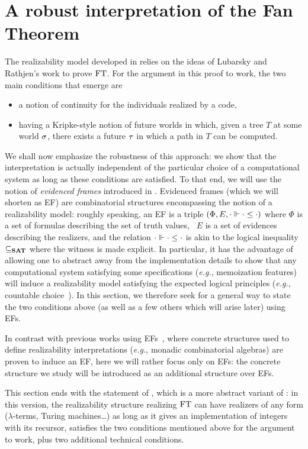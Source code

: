 \documentclass[a4paper,UKenglish,cleveref, autoref, thm-restate]{lipics-v2021}
\begin{document}
\section{A robust interpretation of the Fan Theorem}
\label{s:robust}
The realizability model developed in  relies on the ideas
of Lubarsky and Rathjen's work \cite{LubRat13} to prove $\mathrm{FT}$.
For the argument in this proof to work, the two main conditions that emerge are
\begin{itemize}
\item a notion of continuity for the individuals realized by a code,
\item having a Kripke-style notion of future worlds in which, given a tree $T$ at some world $\sigma$,
there exists a future $\tau$ in which a path in $T$ can be computed.
\end{itemize}
We shall now emphasize the robustness of this approach: we show that the interpretation
is actually independent of the particular choice of a computational system as long as these conditions are satisfied.
To that end, we will use the notion of \emph{evidenced frames} introduced in \cite{CohMiqTat21}.
Evidenced frames (which we will shorten as EF) are combinatorial structures encompassing
the notion of a realizability model:
roughly speaking, an EF is a triple $( \Phi, E, \cdot \Vdash \cdot \leq \cdot )$
where $\Phi$ is a set of formulas describing the set of truth values,
~$E$ is a set of evidences describing the realizers,
and the relation $\cdot \Vdash \cdot \leq \cdot$ is akin to the logical inequality $\subseteq_{{\mathbf{SAT}}}$
where the witness is made explicit.
In particular, it has the advantage of allowing one to abstract away
from the implementation details to show that any computational system satisfying
some specifications (\emph{e.g.}, memoization features) will induce a realizability model
satisfying the expected logical principles (\emph{e.g.}, countable choice~\cite{CohMiqTat21}).
In this section, we therefore seek for a general way to state the two conditions above
(as well as a few others which will arise later) using EFs.

In contrast with previous works using EFs~\cite{CohMiqTat21,GarMiq23,CohGruKirMiq25EffHOL,
CohGruKirMiq25mca}, where concrete structures used to define realizability interpretations
(\textit{e.g.}, monadic combinatorial algebras) are proven to induce an EF,
here we will rather focus only on EFs:
the concrete structure we study will be introduced as an additional structure
over EFs.

This section ends with the statement of , which is a more abstract
variant of : in this version, the realizability structure realizing $\mathrm{FT}$ can have realizers of any form ($\lambda$-terms, Turing machines\ldots) as long as it gives an implementation of integers with its recursor, satisfies the two conditions mentioned above for the argument to work,
plus two additional technical conditions.
\end{document}
